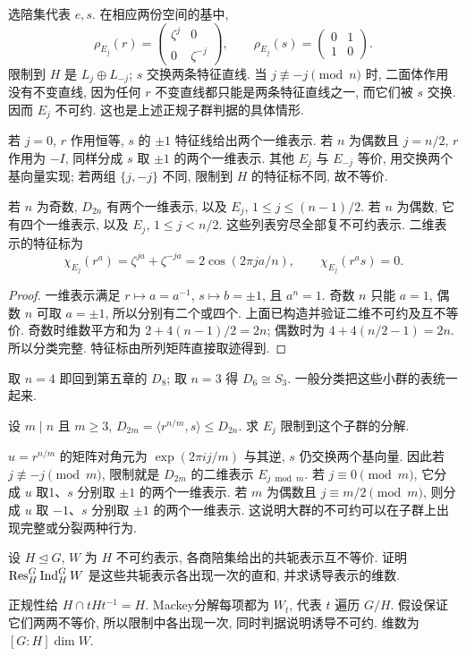 选陪集代表 $e,s$. 在相应两份空间的基中,
\[
 \rho_{E_j}(r)=\begin{pmatrix}\zeta^j&0\\0&\zeta^{-j}\end{pmatrix},\qquad
 \rho_{E_j}(s)=\begin{pmatrix}0&1\\1&0\end{pmatrix}.
\]
限制到 $H$ 是 $L_j\oplus L_{-j}$; $s$ 交换两条特征直线. 当 $j\not\equiv-j\pmod n$ 时, 二面体作用没有不变直线, 因为任何 $r$ 不变直线都只能是两条特征直线之一, 而它们被 $s$ 交换. 因而 $E_j$ 不可约. 这也是上述正规子群判据的具体情形.

若 $j=0$, $r$ 作用恒等, $s$ 的 $\pm1$ 特征线给出两个一维表示. 若 $n$ 为偶数且 $j=n/2$, $r$ 作用为 $-I$, 同样分成 $s$ 取 $\pm1$ 的两个一维表示. 其他 $E_j$ 与 $E_{-j}$ 等价, 用交换两个基向量实现; 若两组 $\{j,-j\}$ 不同, 限制到 $H$ 的特征标不同, 故不等价.

\begin{theorem}
若 $n$ 为奇数, $D_{2n}$ 有两个一维表示, 以及 $E_j$, $1\le j\le(n-1)/2$. 若 $n$ 为偶数, 它有四个一维表示, 以及 $E_j$, $1\le j<n/2$. 这些列表穷尽全部复不可约表示. 二维表示的特征标为
\[
 \chi_{E_j}(r^a)=\zeta^{ja}+\zeta^{-ja}=2\cos(2\pi ja/n),\qquad
 \chi_{E_j}(r^as)=0.
\]
\end{theorem}
\begin{proof}
一维表示满足 $r\mapsto a=a^{-1}$, $s\mapsto b=\pm1$, 且 $a^n=1$. 奇数 $n$ 只能 $a=1$, 偶数 $n$ 可取 $a=\pm1$, 所以分别有二个或四个. 上面已构造并验证二维不可约及互不等价. 奇数时维数平方和为 $2+4(n-1)/2=2n$; 偶数时为 $4+4(n/2-1)=2n$. 所以分类完整. 特征标由所列矩阵直接取迹得到.
\end{proof}
取 $n=4$ 即回到第五章的 $D_8$; 取 $n=3$ 得 $D_6\cong S_3$. 一般分类把这些小群的表统一起来.

\begin{example}
设 $m\mid n$ 且 $m\ge3$, $D_{2m}=\langle r^{n/m},s\rangle\le D_{2n}$. 求 $E_j$ 限制到这个子群的分解.
\end{example}
\begin{solution}
$u=r^{n/m}$ 的矩阵对角元为 $\exp(2\pi i j/m)$ 与其逆, $s$ 仍交换两个基向量. 因此若 $j\not\equiv-j\pmod m$, 限制就是 $D_{2m}$ 的二维表示 $E_{j\bmod m}$. 若 $j\equiv0\pmod m$, 它分成 $u$ 取1、$s$ 分别取 $\pm1$ 的两个一维表示. 若 $m$ 为偶数且 $j\equiv m/2\pmod m$, 则分成 $u$ 取 $-1$、$s$ 分别取 $\pm1$ 的两个一维表示. 这说明大群的不可约可以在子群上出现完整或分裂两种行为.
\end{solution}

\begin{exercise}
设 $H\trianglelefteq G$, $W$ 为 $H$ 不可约表示, 各商陪集给出的共轭表示互不等价. 证明 $\operatorname{Res}_H^G\operatorname{Ind}_H^G W$ 是这些共轭表示各出现一次的直和, 并求诱导表示的维数.
\end{exercise}
\begin{solution}
正规性给 $H\cap tHt^{-1}=H$. Mackey分解每项都为 $W_t$, 代表 $t$ 遍历 $G/H$. 假设保证它们两两不等价, 所以限制中各出现一次, 同时判据说明诱导不可约. 维数为 $[G:H]\dim W$.
\end{solution}
